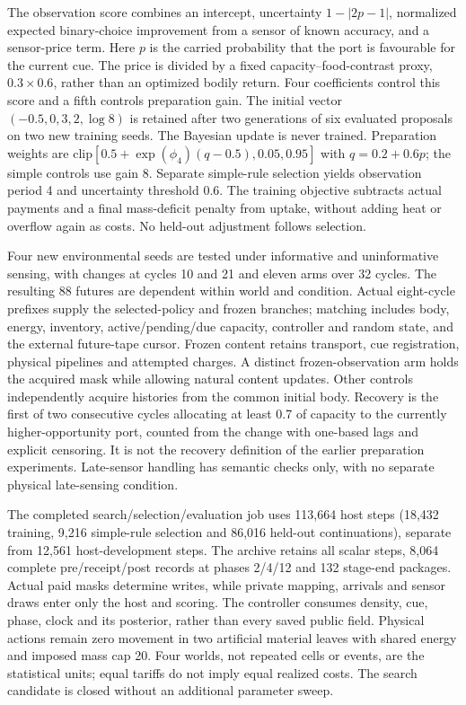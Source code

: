 The observation score combines an intercept, uncertainty $1-|2p-1|$, normalized expected binary-choice improvement from a sensor of known accuracy, and a sensor-price term. Here $p$ is the carried probability that the port is favourable for the current cue. The price is divided by a fixed capacity--food-contrast proxy, $0.3\times0.6$, rather than an optimized bodily return. Four coefficients control this score and a fifth controls preparation gain. The initial vector $(-0.5,0,3,2,\log 8)$ is retained after two generations of six evaluated proposals on two new training seeds. The Bayesian update is never trained. Preparation weights are $\mathrm{clip}[0.5+\exp(\phi_4)(q-0.5),0.05,0.95]$ with $q=0.2+0.6p$; the simple controls use gain 8. Separate simple-rule selection yields observation period 4 and uncertainty threshold 0.6. The training objective subtracts actual payments and a final mass-deficit penalty from uptake, without adding heat or overflow again as costs. No held-out adjustment follows selection.

Four new environmental seeds are tested under informative and uninformative sensing, with changes at cycles 10 and 21 and eleven arms over 32 cycles. The resulting 88 futures are dependent within world and condition. Actual eight-cycle prefixes supply the selected-policy and frozen branches; matching includes body, energy, inventory, active/pending/due capacity, controller and random state, and the external future-tape cursor. Frozen content retains transport, cue registration, physical pipelines and attempted charges. A distinct frozen-observation arm holds the acquired mask while allowing natural content updates. Other controls independently acquire histories from the common initial body. Recovery is the first of two consecutive cycles allocating at least 0.7 of capacity to the currently higher-opportunity port, counted from the change with one-based lags and explicit censoring. It is not the recovery definition of the earlier preparation experiments. Late-sensor handling has semantic checks only, with no separate physical late-sensing condition.

The completed search/selection/evaluation job uses 113,664 host steps (18,432 training, 9,216 simple-rule selection and 86,016 held-out continuations), separate from 12,561 host-development steps. The archive retains all scalar steps, 8,064 complete pre/receipt/post records at phases 2/4/12 and 132 stage-end packages. Actual paid masks determine writes, while private mapping, arrivals and sensor draws enter only the host and scoring. The controller consumes density, cue, phase, clock and its posterior, rather than every saved public field. Physical actions remain zero movement in two artificial material leaves with shared energy and imposed mass cap 20. Four worlds, not repeated cells or events, are the statistical units; equal tariffs do not imply equal realized costs. The search candidate is closed without an additional parameter sweep.

